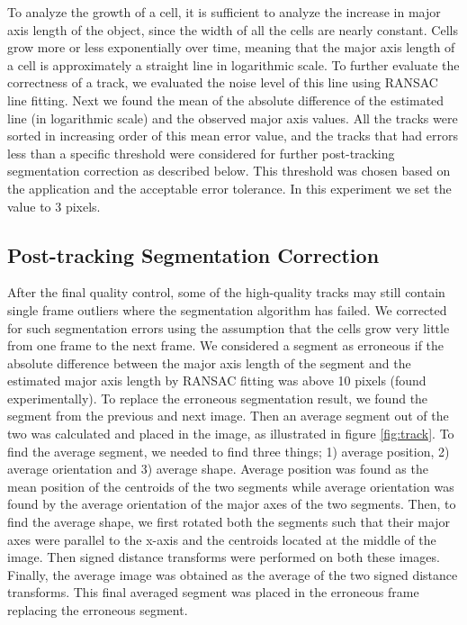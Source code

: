 \documentclass[journal]{IEEEtran}
\begin{document}
To analyze the growth of a cell, it is sufficient to analyze the increase in major axis length of the object, since the width of all the cells are nearly constant. Cells grow more or less exponentially over time, meaning that the major axis length of a cell is approximately a straight line in logarithmic scale. To further evaluate the correctness of a track, we evaluated the noise level of this line using RANSAC  \cite {martinrandom1981} line fitting. Next we found the mean of the absolute difference of the estimated line (in logarithmic scale) and the observed major axis values. All the tracks were sorted in increasing order of this mean error value, and the tracks that had errors less than a specific threshold were considered for further post-tracking segmentation correction as described below. This threshold was chosen based on the application and the acceptable error tolerance. In this experiment we set the value to 3 pixels.

\subsection{Post-tracking Segmentation Correction}
After the final quality control, some of the high-quality tracks may still contain single frame outliers where the segmentation algorithm has failed. We corrected for such segmentation errors using the assumption that the cells grow very little from one frame to the next frame. We considered a segment as erroneous if the absolute difference between the major axis length of the segment and the estimated major axis length by RANSAC fitting was above 10 pixels (found experimentally). To replace the erroneous segmentation result, we found the segment from the previous and next image. Then an average segment out of the two was calculated and placed in the image, as illustrated in figure \ref{fig:track}. To find the average segment, we needed to find three things; 1) average position, 2) average orientation and 3) average shape. Average position was found as the mean position of the centroids of the two segments while average orientation was found by the average orientation of the major axes of the two segments. Then, to find the average shape, we first rotated both the segments such that their major axes were parallel to the x-axis and the centroids located at the middle of the image. Then signed distance transforms were performed on both these images. Finally, the average image was obtained as the average of the two signed distance transforms. This final averaged segment was placed in the erroneous frame replacing the erroneous segment.
\end{document}
